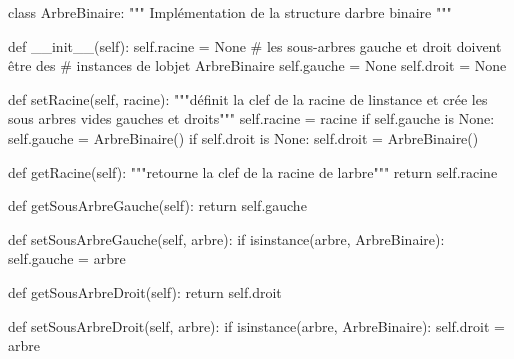 \documentclass[
  a4paper,
  DIV=11,
  numbers=noendperiod]{scrartcl}
\newenvironment{Shaded}{\begin{snugshade}}{\end{snugshade}}
\newcommand{\BuiltInTok}[1]{\textcolor[rgb]{0.00,0.23,0.31}{#1}}
\newcommand{\CommentTok}[1]{\textcolor[rgb]{0.37,0.37,0.37}{#1}}
\newcommand{\ControlFlowTok}[1]{\textcolor[rgb]{0.00,0.23,0.31}{#1}}
\newcommand{\FunctionTok}[1]{\textcolor[rgb]{0.28,0.35,0.67}{#1}}
\newcommand{\KeywordTok}[1]{\textcolor[rgb]{0.00,0.23,0.31}{#1}}
\newcommand{\NormalTok}[1]{\textcolor[rgb]{0.00,0.23,0.31}{#1}}
\newcommand{\OperatorTok}[1]{\textcolor[rgb]{0.37,0.37,0.37}{#1}}
\newcommand{\VariableTok}[1]{\textcolor[rgb]{0.07,0.07,0.07}{#1}}
\begin{document}
\begin{Shaded}
\begin{Highlighting}[]
\KeywordTok{class}\NormalTok{ ArbreBinaire:}
    \CommentTok{""" Implémentation de la structure d\textquotesingle{}arbre binaire """}

    \KeywordTok{def} \FunctionTok{\_\_init\_\_}\NormalTok{(}\VariableTok{self}\NormalTok{):}
        \VariableTok{self}\NormalTok{.racine }\OperatorTok{=} \VariableTok{None}
        \CommentTok{\# les sous{-}arbres gauche et droit doivent être des }
        \CommentTok{\# instances de l\textquotesingle{}objet ArbreBinaire}
        \VariableTok{self}\NormalTok{.gauche }\OperatorTok{=} \VariableTok{None}
        \VariableTok{self}\NormalTok{.droit }\OperatorTok{=} \VariableTok{None}

    \KeywordTok{def}\NormalTok{ setRacine(}\VariableTok{self}\NormalTok{, racine):}
        \CommentTok{"""définit la clef de la racine de l\textquotesingle{}instance}
\CommentTok{         et crée les sous arbres vides gauches et droits"""}
        \VariableTok{self}\NormalTok{.racine }\OperatorTok{=}\NormalTok{ racine}
        \ControlFlowTok{if} \VariableTok{self}\NormalTok{.gauche }\KeywordTok{is} \VariableTok{None}\NormalTok{:}
            \VariableTok{self}\NormalTok{.gauche }\OperatorTok{=}\NormalTok{ ArbreBinaire()}
        \ControlFlowTok{if} \VariableTok{self}\NormalTok{.droit }\KeywordTok{is} \VariableTok{None}\NormalTok{:}
            \VariableTok{self}\NormalTok{.droit }\OperatorTok{=}\NormalTok{ ArbreBinaire()}
    
    \KeywordTok{def}\NormalTok{ getRacine(}\VariableTok{self}\NormalTok{):}
        \CommentTok{"""retourne la clef de la racine de l\textquotesingle{}arbre"""}
        \ControlFlowTok{return} \VariableTok{self}\NormalTok{.racine}

    \KeywordTok{def}\NormalTok{ getSousArbreGauche(}\VariableTok{self}\NormalTok{):}
        \ControlFlowTok{return} \VariableTok{self}\NormalTok{.gauche}

    \KeywordTok{def}\NormalTok{ setSousArbreGauche(}\VariableTok{self}\NormalTok{, arbre):}
        \ControlFlowTok{if} \BuiltInTok{isinstance}\NormalTok{(arbre, ArbreBinaire):}
            \VariableTok{self}\NormalTok{.gauche }\OperatorTok{=}\NormalTok{ arbre}

    \KeywordTok{def}\NormalTok{ getSousArbreDroit(}\VariableTok{self}\NormalTok{):}
        \ControlFlowTok{return} \VariableTok{self}\NormalTok{.droit}

    \KeywordTok{def}\NormalTok{ setSousArbreDroit(}\VariableTok{self}\NormalTok{, arbre):}
        \ControlFlowTok{if} \BuiltInTok{isinstance}\NormalTok{(arbre, ArbreBinaire):}
            \VariableTok{self}\NormalTok{.droit }\OperatorTok{=}\NormalTok{ arbre}


\end{Highlighting}
\end{Shaded}
\end{document}
